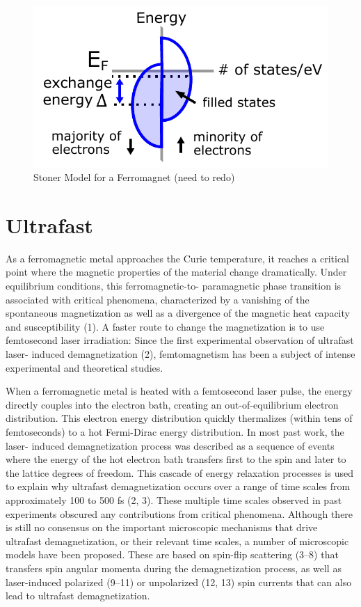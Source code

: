 \begin{figure}
	\begin{center}
		\includegraphics[width=150mm]{figs/StonerModel}
	\end{center}
	\caption{Stoner Model for a Ferromagnet (need to redo)}
	\label{StonerModel}
\end{figure}


\section{Ultrafast}
As a ferromagnetic metal approaches the Curie temperature, it reaches a critical point where the magnetic properties of the material change dramatically. Under equilibrium conditions, this ferromagnetic-to- paramagnetic phase transition is associated with critical phenomena, characterized by a vanishing of the spontaneous magnetization as well as a divergence of the magnetic heat capacity and susceptibility (1). A faster route to change the magnetization is to use femtosecond laser irradiation: Since the first experimental observation of ultrafast laser- induced demagnetization (2), femtomagnetism has been a subject of intense experimental and theoretical studies.

When a ferromagnetic metal is heated with a femtosecond laser pulse, the energy directly couples into the electron bath, creating an out-of-equilibrium electron distribution. This electron energy distribution quickly thermalizes (within tens of femtoseconds) to a hot Fermi-Dirac energy distribution. In most past work, the laser- induced demagnetization process was described as a sequence of events where the energy of the hot electron bath transfers first to the spin and later to the lattice degrees of freedom. This cascade of energy relaxation processes is used to explain why ultrafast demagnetization occurs over a range of time scales from approximately 100 to 500 fs (2, 3). These multiple time scales observed in past experiments obscured any contributions from critical phenomena. Although there is still no consensus on the important microscopic mechanisms that drive ultrafast demagnetization, or their relevant time scales, a number of microscopic models have been proposed. These are based on spin-flip scattering (3–8) that transfers spin angular momenta during the demagnetization process, as well as laser-induced polarized (9–11) or unpolarized (12, 13) spin currents that can also lead to ultrafast demagnetization.

